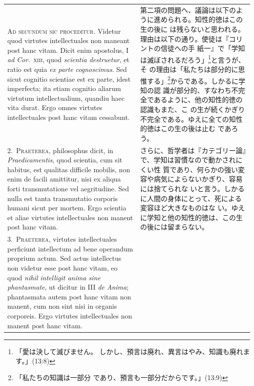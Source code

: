 \documentclass[paper=a4paper,fontsize=10pt,jafontsize=9pt,titlepage]{jlreq}
\begin{document}
\begin{longtable}{p{21em}p{21em}}

 {\scshape Ad secundum sic proceditur}. Videtur quod virtutes
 intellectuales non maneant post hanc vitam. Dicit enim apostolus, I
 {\itshape ad Cor}.~{\scshape xiii}, quod {\itshape scientia
 destruetur}, et ratio est quia {\itshape ex parte cognoscimus}. Sed
 sicut cognitio scientiae est ex parte, idest imperfecta; ita etiam
 cognitio aliarum virtutum intellectualium, quandiu haec vita
 durat. Ergo omnes virtutes intellectuales post hanc vitam cessabunt.

 
&

 第二項の問題へ、議論は以下のように進められる。知性的徳はこの生の後に
 は残らないと思われる。理由は以下の通り。使徒は『コリントの信徒への手
 紙一』で「学知は滅ぼされるだろう」\footnote{「愛は決して滅びません。
 しかし、預言は廃れ、異言はやみ、知識も廃れます。」(13:8)}と言うが、そ
 の理由は「私たちは部分的に思惟する」\footnote{「私たちの知識は一部分
 であり、預言も一部分だからです。」(13:9)}からである。しかるに学知の認
 識が部分的、すなわち不完全であるように、他の知性的徳の認識もまた、こ
 の生が続くかぎり不完全である。ゆえに全ての知性的徳はこの生の後は止む
 であろう。 

\\

2.~{\scshape Praeterea}, philosophus dicit, in {\itshape
Praedicamentis}, quod scientia, cum sit habitus, est qualitas
difficile mobilis, non enim de facili amittitur, nisi ex aliqua forti
transmutatione vel aegritudine. Sed nulla est tanta transmutatio
corporis humani sicut per mortem. Ergo scientia et aliae virtutes
intellectuales non manent post hanc vitam.


&

 さらに、哲学者は『カテゴリー論』で、学知は習慣なので動かされにくい性
 質であり、何らかの強い変容や病気によらないかぎり、容易には捨てられな
 いと言う。しかるに人間の身体にとって、死による変容ほど大きなものはな
 い。ゆえに学知と他の知性的徳は、この生の後には留まらない。

\\




3.~{\scshape Praeterea}, virtutes intellectuales perficiunt
intellectum ad bene operandum proprium actum. Sed actus intellectus
non videtur esse post hanc vitam, eo quod {\itshape nihil intelligit
anima sine phantasmate}, ut dicitur in III {\itshape de Anima};
phantasmata autem post hanc vitam non manent, cum non sint nisi in
organis corporeis. Ergo virtutes intellectuales non manent post hanc
vitam.
 

\end{longtable}
\end{document}
